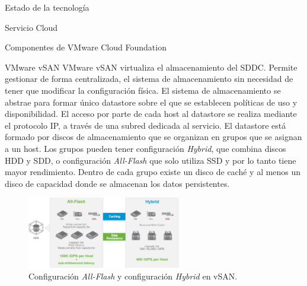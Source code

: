 \begin{chapter}{Estado de la tecnología}
\begin{section}{Servicio Cloud}
\begin{subsection}{Componentes de VMware Cloud Foundation}
    \begin{subsubsection}{VMware vSAN}
        VMware vSAN virtualiza el almacenamiento del SDDC. Permite gestionar de forma centralizada, el sistema de almacenamiento sin necesidad de tener que modificar la configuración física. El sistema de almacenamiento se abstrae para formar único datastore sobre el que se establecen políticas de uso y disponibilidad. El acceso por parte de cada host al datastore se realiza mediante el protocolo IP, a través de una subred dedicada al servicio. El datastore está formado por discos de almacenamiento que se organizan en grupos que se asignan a un host. Los grupos pueden tener configuración \textit{Hybrid}, que combina discos HDD y SDD, o configuración \textit{All-Flash} que solo utiliza SSD y por lo tanto tiene mayor rendimiento. Dentro de cada grupo existe un disco de caché y al menos un disco de capacidad donde se almacenan los datos persistentes\cite{operacionesVSAN}. 
        
        \begin{figure}[h]
        \centering
            \includegraphics[width=0.6\textwidth]{imaxes/cap2recursos/rendimientoVSAN.png}
            \caption{Configuración \textit{All-Flash} y configuración \textit{Hybrid} en vSAN.}
            \label{fig:performance-Hybrid-AllFlash-vSAN}
        \end{figure}
        \FloatBarrier
    \end{subsubsection}
    

\end{subsection}
\end{section}
\end{chapter}
